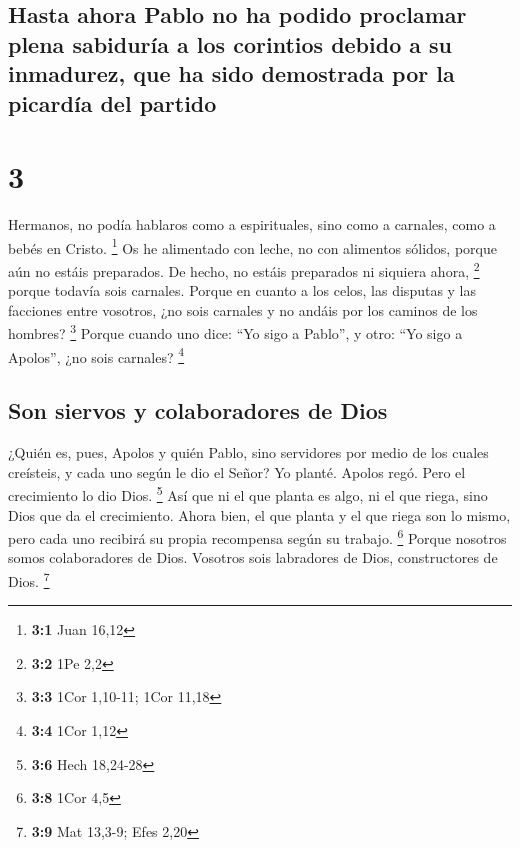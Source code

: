 \hypertarget{hasta-ahora-pablo-no-ha-podido-proclamar-plena-sabiduruxeda-a-los-corintios-debido-a-su-inmadurez-que-ha-sido-demostrada-por-la-picarduxeda-del-partido}{%
\subsection{Hasta ahora Pablo no ha podido proclamar plena sabiduría a
los corintios debido a su inmadurez, que ha sido demostrada por la
picardía del
partido}\label{hasta-ahora-pablo-no-ha-podido-proclamar-plena-sabiduruxeda-a-los-corintios-debido-a-su-inmadurez-que-ha-sido-demostrada-por-la-picarduxeda-del-partido}}

\hypertarget{section-2}{%
\section{3}\label{section-2}}

 Hermanos, no podía hablaros como a espirituales, sino
como a carnales, como a bebés en Cristo. \footnote{\textbf{3:1} Juan
  16,12}  Os he alimentado con leche, no con alimentos
sólidos, porque aún no estáis preparados. De hecho, no estáis preparados
ni siquiera ahora, \footnote{\textbf{3:2} 1Pe 2,2}  porque
todavía sois carnales. Porque en cuanto a los celos, las disputas y las
facciones entre vosotros, ¿no sois carnales y no andáis por los caminos
de los hombres? \footnote{\textbf{3:3} 1Cor 1,10-11; 1Cor 11,18}
 Porque cuando uno dice: ``Yo sigo a Pablo'', y otro: ``Yo
sigo a Apolos'', ¿no sois carnales? \footnote{\textbf{3:4} 1Cor 1,12}

\hypertarget{son-siervos-y-colaboradores-de-dios}{%
\subsection{Son siervos y colaboradores de
Dios}\label{son-siervos-y-colaboradores-de-dios}}

 ¿Quién es, pues, Apolos y quién Pablo, sino servidores
por medio de los cuales creísteis, y cada uno según le dio el Señor?
 Yo planté. Apolos regó. Pero el crecimiento lo dio Dios.
\footnote{\textbf{3:6} Hech 18,24-28}  Así que ni el que
planta es algo, ni el que riega, sino Dios que da el crecimiento.
 Ahora bien, el que planta y el que riega son lo mismo,
pero cada uno recibirá su propia recompensa según su trabajo.
\footnote{\textbf{3:8} 1Cor 4,5}  Porque nosotros somos
colaboradores de Dios. Vosotros sois labradores de Dios, constructores
de Dios. \footnote{\textbf{3:9} Mat 13,3-9; Efes 2,20}

